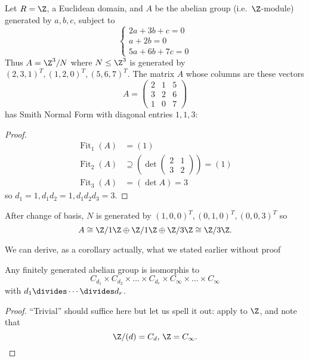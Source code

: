\documentclass[a4paper]{article}
\DeclareMathOperator{\fit}{Fit}
\begin{document}
\begin{eg}
  Let \(R = \Z\), a Euclidean domain, and \(A\) be the abelian group (i.e.\ \(\Z\)-module) generated by \(a, b, c\), subject to
  \[
    \begin{cases}
      2a + 3b + c = 0 \\
      a + 2b = 0 \\
      5a + 6b + 7c = 0
    \end{cases}
  \]
  Thus \(A = \Z^3/N\) where \(N \leq \Z^3\) is generated by \((2, 3, 1)^T, (1, 2, 0)^T, (5, 6, 7)^T\). The matrix \(A\) whose columns are these vectors
  \[
    A =
    \begin{pmatrix}
      2 & 1 & 5 \\
      3 & 2 & 6 \\
      1 & 0 & 7
    \end{pmatrix}
  \]
  has Smith Normal Form with diagonal entries \(1, 1, 3\):

  \begin{proof}
    \begin{align*}
      \fit_1(A) &= (1) \\
      \fit_2(A) &\supseteq \left( \det
                  \begin{pmatrix}
                    2 & 1 \\
                    3 & 2
                  \end{pmatrix}
                        \right)
                        = (1) \\
      \fit_3(A) &= (\det A) = 3
    \end{align*}
    so \(d_1 = 1, d_1d_2 = 1, d_1d_2d_3 = 3\).
  \end{proof}

  After change of basis, \(N\) is generated by \((1, 0, 0)^T, (0, 1, 0)^T, (0, 0, 3)^T\) so
  \[
    A \cong \Z/1\Z \oplus \Z/1\Z \oplus \Z/3\Z \cong \Z/3\Z.
  \]
\end{eg}

We can derive, as a corollary actually, what we stated earlier without proof

\begin{theorem}
  Any finitely generated abelian group is isomorphis to
  \[
    C_{d_1} \times C_{d_2} \times \dots \times C_{d_r} \times C_\infty \times \dots \times C_\infty
  \]
  with \(d_1 \divides \cdots \divides d_r\).
\end{theorem}

\begin{proof}
  ``Trivial'' should suffice here but let us spell it out: apply  to \(\Z\), and note that
  \[
    \Z/(d) = C_d, \, \Z = C_\infty.
  \]
\end{proof}
\end{document}
